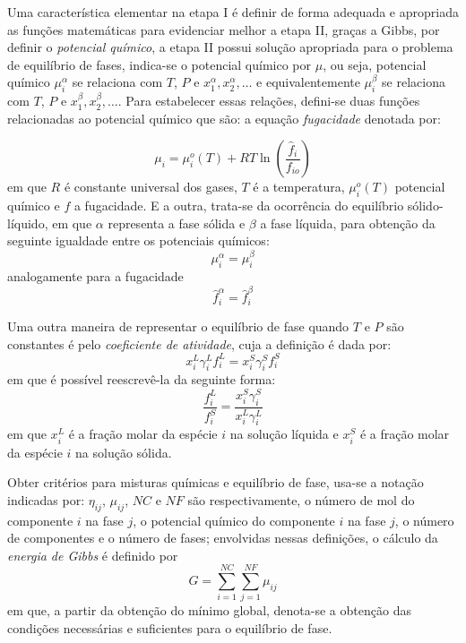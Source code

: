 Uma característica elementar na etapa I é definir de forma adequada e apropriada as funções matemáticas para evidenciar melhor a etapa II, graças a Gibbs, por definir o \textit{potencial químico}, a etapa II possui solução apropriada para o problema de equilíbrio de fases, indica-se o potencial químico por $\mu$, ou seja, potencial químico $\mu_{i}^{\alpha}$ se relaciona com $T$, $P$ e $x_{1}^{\alpha}, x_{2}^{\alpha}, \ldots$ e equivalentemente $\mu_{i}^{\beta}$ se relaciona com $T$, $P$ e $x_{1}^{\beta}, x_{2}^{\beta}, \ldots$. Para estabelecer essas relações, defini-se duas funções relacionadas ao potencial químico que são: a equação \textit{fugacidade} denotada por:
	
	\begin{equation}\label{eq:fugacidade1}
	\mu_{i}=\mu_{i}^{o}(T)+RT\ln\left(\dfrac{\widehat{f}_ {i}}{f_{io}}\right)
	\end{equation}
	em que $R$ é constante universal dos gases, $T$ é a temperatura, $\mu_{i}^{o}(T)$ potencial químico e $f$ a fugacidade. 
	E a outra, trata-se da ocorrência do equilíbrio sólido-líquido, em que $\alpha$ representa a fase sólida e $\beta$ a fase líquida, para obtenção da seguinte igualdade entre os potenciais químicos:
	\begin{equation}\label{eq:equilibrio1}
	\mu_{i}^{\alpha}=\mu_{i}^{\beta}
	\end{equation}
	analogamente para a fugacidade
	\begin{equation}
	\widehat{f}_ {i}^{\alpha}=\widehat{f}_ {i}^{\beta}
	\end{equation}
	
Uma outra maneira de representar o equilíbrio de fase quando $T$ e $P$ são constantes é pelo \textit{coeficiente de atividade}, cuja a definição é dada por:
	\begin{equation}\label{eq:coe_atividade}
	x_{i}^{L}\gamma_{i}^{L}f_{i}^{L}=x_{i}^{S}\gamma_{i}^{S}f_{i}^{S}
	\end{equation}
	em que é possível reescrevê-la da seguinte forma:
	\begin{equation}\label{eq:coe_atividade1}
	\dfrac{f_{i}^{L}}{f_{i}^{S}}=\dfrac{x_{i}^{S}\gamma_{i}^{S}}{x_{i}^{L}\gamma_{i}^{L}}
	\end{equation}
	em que $x_{i}^{L}$ é a fração molar da espécie $i$ na solução líquida e $x_{i}^{S}$ é a fração molar da espécie $i$ na solução sólida.
	\cite{SMITH2000,Rocha2009a,Prausnitz}
	
Obter critérios para misturas químicas e equilíbrio de fase, usa-se a notação indicadas por: $\eta_{ij}$, $\mu_{ij}$, $NC$ e $NF$ são respectivamente, o número de mol do componente $i$ na fase $j$, o potencial químico do componente $i$ na fase $j$, o número de componentes e o número de fases; envolvidas  nessas definições, o cálculo da \textit{energia de Gibbs} é definido por
	\begin{equation}\label{eq:minimo_globa_1}
	G=\sum_{i=1}^{NC}\sum_{j=1}^{NF}\mu_{ij} 
	\end{equation}
	em que, a partir da obtenção do mínimo global, denota-se a obtenção das condições necessárias e suficientes para o equilíbrio de fase.
	

